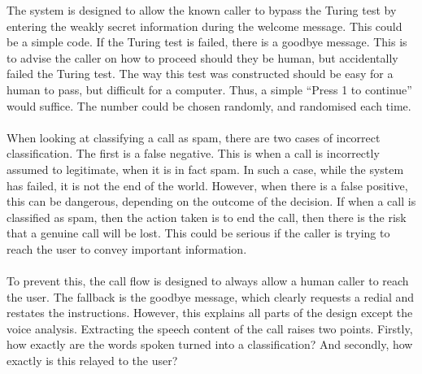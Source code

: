 \documentclass[main.tex]{subfiles}
\begin{document}
The system is designed to allow the known caller to bypass the Turing test by entering the weakly secret information during the welcome message. This could be a simple code. If the Turing test is failed, there is a goodbye message. This is to advise the caller on how to proceed should they be human, but accidentally failed the Turing test. The way this test was constructed should be easy for a human to pass, but difficult for a computer. Thus, a simple ``Press 1 to continue'' would suffice. The number could be chosen randomly, and randomised each time.
\\\\
When looking at classifying a call as spam, there are two cases of incorrect classification. The first is a false negative. This is when a call is incorrectly assumed to legitimate, when it is in fact spam. In such a case, while the system has failed, it is not the end of the world. However, when there is a false positive, this can be dangerous, depending on the outcome of the decision. If when a call is classified as spam, then the action taken is to end the call, then there is the risk that a genuine call will be lost. This could be serious if the caller is trying to reach the user to convey important information.
\\\\
To prevent this, the call flow is designed to always allow a human caller to reach the user. The fallback is the goodbye message, which clearly requests a redial and restates the instructions. However, this explains all parts of the design except the voice analysis. Extracting the speech content of the call raises two points. Firstly, how exactly are the words spoken turned into a classification? And secondly, how exactly is this relayed to the user?
\end{document}
